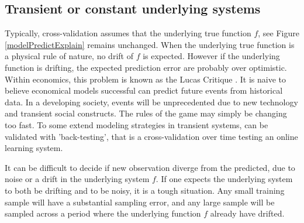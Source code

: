 \subsection{Transient or constant underlying systems}
Typically, cross-validation assumes that the underlying true function $f$, see Figure \ref{modelPredictExplain} remains unchanged. When the underlying true function is a physical rule of nature, no drift of $f$ is expected. However if the underlying function is drifting, the expected prediction error are probably over optimistic. Within economics, this problem is known as the Lucas Critique \cite{wiki:Lucus}. It is naive to believe economical models successful can predict future events from historical data. In a developing society, events will be unprecedented due to new technology and transient social constructs. The rules of the game may simply be changing too fast. To some extend modeling strategies in transient systems, can be validated with 'back-testing', that is a cross-validation over time testing an online learning system.

It can be difficult to decide if new observation diverge from the predicted, due to noise or a drift in the underlying system $f$. If one expects the underlying system to both be drifting and to be noisy, it is a tough situation. Any small training sample will have a substantial sampling error, and any large sample will be sampled across a period where the underlying function $f$ already have drifted.

